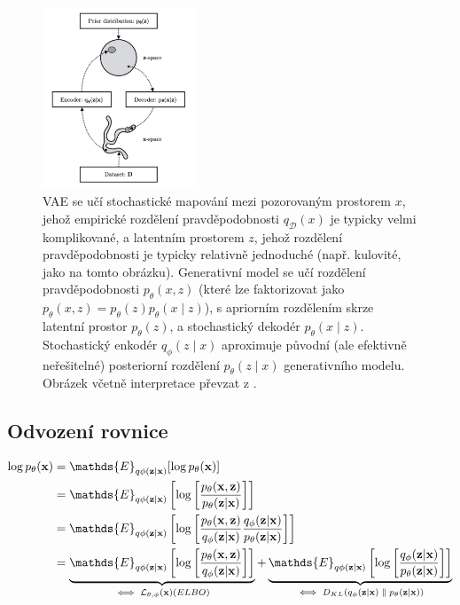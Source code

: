 \begin{figure}[H]
    \centering
    \includegraphics[width=0.41\textwidth]{figures/vae_schema.pdf}
    \caption{VAE se učí stochastické mapování mezi pozorovaným prostorem $x$, jehož empirické rozdělení pravděpodobnosti $q_\mathcal{D}(x)$ je typicky velmi komplikované, a latentním prostorem $z$, jehož rozdělení pravděpodobnosti je typicky relativně jednoduché (např. kulovité, jako na tomto obrázku). Generativní model se učí rozdělení pravděpodobnosti $p_\theta(x, z)$ (které lze faktorizovat jako $p_\theta(x, z) = p_\theta(z) p_\theta(x\mid z)$), s apriorním rozdělením skrze latentní prostor $p_\theta(z)$, a stochastický dekodér $p_\theta(x\mid z)$. Stochastický enkodér $q_\phi(z\mid x)$ aproximuje původní (ale efektivně neřešitelné) posteriorní rozdělení $p_\theta(z\mid x)$ generativního modelu. Obrázek včetně interpretace převzat z \cite{Kingma2019}.}
    \label{fig:vae_schema}
\end{figure}

\subsection{Odvození rovnice}
\begin{align}
    \log p_\theta(\textbf{x}) &= \mathds{E}_{q\phi(\textbf{z}\mid\textbf{x})}[\log p_\theta(\textbf{x})] \\
                              &= \mathds{E}_{q\phi(\textbf{z}\mid\textbf{x})} \left[ \log \left[ \frac{p_\theta(\textbf{x}, \textbf{z})}{p_\theta(\textbf{z}\mid\textbf{x})} \right] \right] \\
                              &= \mathds{E}_{q\phi(\textbf{z}\mid\textbf{x})} \left[ \log \left[ \frac{p_\theta(\textbf{x}, \textbf{z})}{q_\phi(\textbf{z}\mid\textbf{x})} \frac{q_\phi(\textbf{z}\mid\textbf{x})}{p_\theta(\textbf{z}\mid\textbf{x})} \right] \right] \\
                              &= \underbrace{ \mathds{E}_{q\phi(\textbf{z}\mid\textbf{x})} \left[ \log \left[ \frac{p_\theta(\textbf{x}, \textbf{z})}{q_\phi(\textbf{z}\mid\textbf{x})} \right] \right] }_\text{$ \iff \mathcal{L}_{\theta,\phi}(\textbf{x}) (ELBO)$} 
                              +  \underbrace{ \mathds{E}_{q\phi(\textbf{z}\mid\textbf{x})} \left[ \log \left[ \frac{q_\phi(\textbf{z}\mid\textbf{x})}{p_\theta(\textbf{z}\mid\textbf{x})} \right] \right] }_\text{$\iff D_{KL}(q_\phi(\textbf{z}\mid\textbf{x})\parallel p_\theta(\textbf{z}\mid\textbf{x}))$} \\ \label{eq:elbo_kl}
\end{align}

